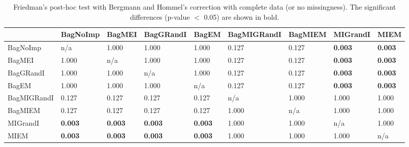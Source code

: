 \documentclass{iosart2c}
\begin{document}
\begin{table*}[!ht]
\centering
\caption{Friedman's post-hoc test with Bergmann and Hommel's correction with complete data (or no missingness). The significant differences (p-value $<$ 0.05) are shown in bold.}
 \begin{tabular}{|l|llllllll|}
    \hline
     & BagNoImp & BagMEI & BagGRandI & BagEM & BagMIGRandI & BagMIEM & MIGrandI & MIEM \\
    \hline
    BagNoImp & n/a & 1.000 & 1.000 & 1.000 & 0.127 & 0.127 & {\bf 0.003} & {\bf 0.003} \\
    BagMEI & 1.000 & n/a & 1.000 & 1.000 & 0.127 & 0.127 & {\bf 0.003} & {\bf 0.003} \\
    BagGRandI & 1.000 & 1.000 & n/a & 1.000 & 0.127 & 0.127 & {\bf 0.003} & {\bf 0.003} \\
    BagEM & 1.000 & 1.000 & 1.000 & n/a & 0.127 & 0.127 & {\bf 0.003} & {\bf 0.003} \\
    BagMIGRandI & 0.127 & 0.127 & 0.127 & 0.127 & n/a & 1.000 & 1.000 & 1.000 \\
    BagMIEM & 0.127 & 0.127 & 0.127 & 0.127 & 1.000 & n/a & 1.000 & 1.000 \\
    MIGrandI & {\bf 0.003} & {\bf 0.003} & {\bf 0.003} & {\bf 0.003} & 1.000 & 1.000 & n/a & 1.000 \\
    MIEM & {\bf 0.003} & {\bf 0.003} & {\bf 0.003} & {\bf 0.003} & 1.000 & 1.000 & 1.000 & n/a \\
    \hline
    \end{tabular}
    \label{0testing}
\end{table*}
\end{document}
